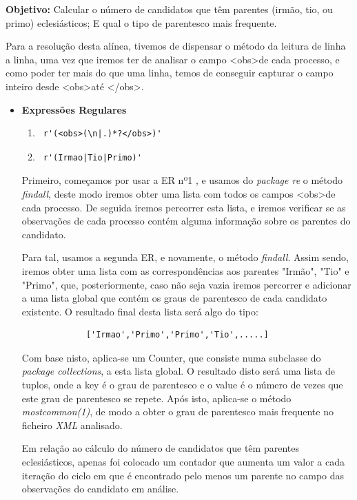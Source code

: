 \documentclass[11pt,a4paper]{report}
\begin{document}
	\textbf{Objetivo:} Calcular o número de candidatos que têm parentes (irmão, tio, ou primo) eclesiásticos; E qual o tipo de parentesco mais frequente.\par
	\vspace{0.5cm}
	\qquad Para a resolução desta alínea, tivemos de dispensar o método da leitura de linha a linha, uma vez que iremos ter de analisar o campo \textless obs\textgreater de cada processo, e como poder ter mais do que uma linha, temos de conseguir capturar o campo inteiro desde \textless obs\textgreater até \textless /obs\textgreater .

	\begin{itemize}
		\item \textbf{Expressões Regulares}
		 \begin{enumerate}
		\item \begin{verbatim} r'(<obs>(\n|.)*?</obs>)'  \end{verbatim} 
		\item \begin{verbatim} r'(Irmao|Tio|Primo)'  \end{verbatim} 
	\end{enumerate}

	Primeiro, começamos por usar a ER nº1 , e usamos do \textit{package re} o método \textit{findall}, deste modo iremos obter uma lista com todos os campos \textless obs\textgreater de cada processo. De seguida iremos percorrer esta lista, e iremos verificar se as observações de cada processo contém alguma informação sobre os parentes do candidato. \par
	\qquad Para tal, usamos a segunda ER, e novamente, o método \textit{findall}. Assim sendo, iremos obter uma lista com as correspondências aos parentes "Irmão", "Tio" e "Primo", que, posteriormente, caso não seja vazia iremos percorrer e adicionar a uma lista global que contém os graus de parentesco de cada candidato existente. O resultado final desta lista será algo do tipo:\par
		\begin{verbatim}
			 ['Irmao','Primo','Primo','Tio',.....]  
	   \end{verbatim} 
	\qquad Com base nisto, aplica-se um Counter, que consiste numa subclasse do \textit{package collections}, a esta lista global. O resultado disto será uma lista de tuplos, onde a key é o grau de parentesco e o value é o número de vezes que este grau de parentesco se repete. Após isto, aplica-se o método \textit{most\textunderscore common(1)}, de modo a obter o grau de parentesco mais frequente no ficheiro \textit{XML} analisado.\par
	\qquad Em relação ao cálculo do número de candidatos que têm parentes eclesiásticos, apenas foi colocado um contador que aumenta um valor a cada iteração do ciclo em que é encontrado pelo menos um parente no campo das observações do candidato em análise.
	
		
	\end{itemize}
\vspace{1cm}
\end{document}
